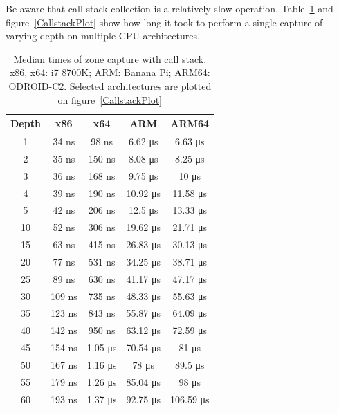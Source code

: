\documentclass[hidelinks,titlepage,a4paper]{article}
\begin{document}
Be aware that call stack collection is a relatively slow operation. Table~\ref{CallstackTimes} and figure~\ref{CallstackPlot} show how long it took to perform a single capture of varying depth on multiple CPU architectures.

\begin{table}[h]
\centering
\begin{tabular}[h]{c|c|c|c|c}
\textbf{Depth} & \textbf{x86} & \textbf{x64} & \textbf{ARM} & \textbf{ARM64} \\ \hline
1 & 34 \si{\nano\second} & 98 \si{\nano\second} & 6.62 \si{\micro\second} & 6.63 \si{\micro\second} \\
2 & 35 \si{\nano\second} & 150 \si{\nano\second} & 8.08 \si{\micro\second} & 8.25 \si{\micro\second} \\
3 & 36 \si{\nano\second} & 168 \si{\nano\second} & 9.75 \si{\micro\second} & 10 \si{\micro\second} \\
4 & 39 \si{\nano\second} & 190 \si{\nano\second} & 10.92 \si{\micro\second} & 11.58 \si{\micro\second} \\
5 & 42 \si{\nano\second} & 206 \si{\nano\second} & 12.5 \si{\micro\second} & 13.33 \si{\micro\second} \\
10 & 52 \si{\nano\second} & 306 \si{\nano\second} & 19.62 \si{\micro\second} & 21.71 \si{\micro\second} \\
15 & 63 \si{\nano\second} & 415 \si{\nano\second} & 26.83 \si{\micro\second} & 30.13 \si{\micro\second} \\
20 & 77 \si{\nano\second} & 531 \si{\nano\second} & 34.25 \si{\micro\second} & 38.71 \si{\micro\second} \\
25 & 89 \si{\nano\second} & 630 \si{\nano\second} & 41.17 \si{\micro\second} & 47.17 \si{\micro\second} \\
30 & 109 \si{\nano\second} & 735 \si{\nano\second} & 48.33 \si{\micro\second} & 55.63 \si{\micro\second} \\
35 & 123 \si{\nano\second} & 843 \si{\nano\second} & 55.87 \si{\micro\second} & 64.09 \si{\micro\second} \\
40 & 142 \si{\nano\second} & 950 \si{\nano\second} & 63.12 \si{\micro\second} & 72.59 \si{\micro\second} \\
45 & 154 \si{\nano\second} & 1.05 \si{\micro\second} & 70.54 \si{\micro\second} & 81 \si{\micro\second} \\
50 & 167 \si{\nano\second} & 1.16 \si{\micro\second} & 78 \si{\micro\second} & 89.5 \si{\micro\second} \\
55 & 179 \si{\nano\second} & 1.26 \si{\micro\second} & 85.04 \si{\micro\second} & 98 \si{\micro\second} \\
60 & 193 \si{\nano\second} & 1.37 \si{\micro\second} & 92.75 \si{\micro\second} & 106.59 \si{\micro\second}
\end{tabular}
\caption{Median times of zone capture with call stack. x86, x64: i7 8700K; ARM: Banana Pi; ARM64: ODROID-C2. Selected architectures are plotted on figure~\ref{CallstackPlot}}
\label{CallstackTimes}
\end{table}
\end{document}
